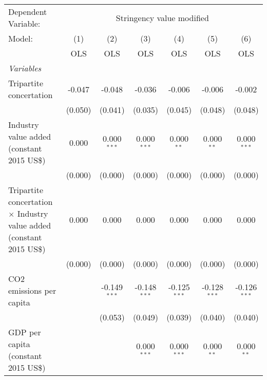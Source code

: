 
\begingroup
\centering
\begin{tabular}{lcccccc}
   \toprule
   Dependent Variable: & \multicolumn{6}{c}{Stringency value modified}\\
   Model:                                                                       & (1)     & (2)            & (3)            & (4)            & (5)            & (6)\\  
                                                                                &  OLS    & OLS            & OLS            & OLS            & OLS            & OLS\\  
   \midrule
   \emph{Variables}\\
   Tripartite concertation                                                      & -0.047  & -0.048         & -0.036         & -0.006         & -0.006         & -0.002\\   
                                                                                & (0.050) & (0.041)        & (0.035)        & (0.045)        & (0.048)        & (0.048)\\   
   Industry value added (constant 2015 US\$)                                    & 0.000   & 0.000$^{***}$  & 0.000$^{***}$  & 0.000$^{**}$   & 0.000$^{**}$   & 0.000$^{***}$\\   
                                                                                & (0.000) & (0.000)        & (0.000)        & (0.000)        & (0.000)        & (0.000)\\   
   Tripartite concertation $\times$ Industry value added (constant 2015 US\$)   & 0.000   & 0.000          & 0.000          & 0.000          & 0.000          & 0.000\\   
                                                                                & (0.000) & (0.000)        & (0.000)        & (0.000)        & (0.000)        & (0.000)\\   
   CO2 emissions per capita                                                     &         & -0.149$^{***}$ & -0.148$^{***}$ & -0.125$^{***}$ & -0.128$^{***}$ & -0.126$^{***}$\\   
                                                                                &         & (0.053)        & (0.049)        & (0.039)        & (0.040)        & (0.040)\\   
   GDP per capita (constant 2015 US\$)                                          &         &                & 0.000$^{***}$  & 0.000$^{***}$  & 0.000$^{**}$   & 0.000$^{**}$\\   

\end{tabular}
